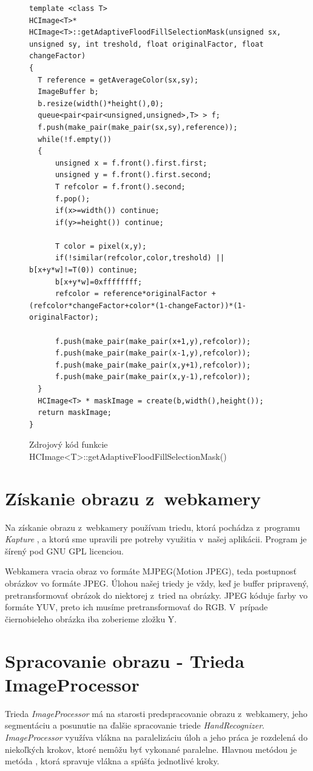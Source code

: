 \begin{figure}[htp]
\begin{lstlisting}
template <class T>
HCImage<T>* HCImage<T>::getAdaptiveFloodFillSelectionMask(unsigned sx, unsigned sy, int treshold, float originalFactor, float changeFactor)
{
  T reference = getAverageColor(sx,sy);
  ImageBuffer b;
  b.resize(width()*height(),0);
  queue<pair<pair<unsigned,unsigned>,T> > f;
  f.push(make_pair(make_pair(sx,sy),reference));
  while(!f.empty())
  {
      unsigned x = f.front().first.first;
      unsigned y = f.front().first.second;
      T refcolor = f.front().second;
      f.pop();
      if(x>=width()) continue;
      if(y>=height()) continue;

      T color = pixel(x,y);
      if(!similar(refcolor,color,treshold) || b[x+y*w]!=T(0)) continue;
      b[x+y*w]=0xffffffff;
      refcolor = reference*originalFactor + (refcolor*changeFactor+color*(1-changeFactor))*(1-originalFactor);

      f.push(make_pair(make_pair(x+1,y),refcolor));
      f.push(make_pair(make_pair(x-1,y),refcolor));
      f.push(make_pair(make_pair(x,y+1),refcolor));
      f.push(make_pair(make_pair(x,y-1),refcolor));
  }
  HCImage<T> * maskImage = create(b,width(),height());
  return maskImage;
}\end{lstlisting}
\caption{Zdrojový kód funkcie HCImage<T>::getAdaptiveFloodFillSelectionMask()}
\label{fig:getAdaptiveFloodFillSelectionMask}
\end{figure}

\section{Získanie obrazu z~webkamery}
Na získanie obrazu z~webkamery používam triedu, ktorá pochádza z~programu \textit{Kapture} \cite{kapture}, a ktorú sme upravili pre potreby využitia v~našej aplikácii. Program je šírený pod GNU GPL licenciou.

Webkamera vracia obraz vo formáte MJPEG(Motion JPEG), teda postupnosť obrázkov vo formáte JPEG. Úlohou našej triedy je vždy, keď je buffer pripravený,  pretransformovať obrázok do niektorej z~tried na obrázky. JPEG kóduje farby vo formáte YUV, preto ich musíme pretransformovať do RGB. V~prípade čiernobieleho obrázka iba zoberieme zložku Y.

\section{Spracovanie obrazu - Trieda ImageProcessor}
\label{chap:imageprocess}
Trieda \textit{ImageProcessor} má na starosti predspracovanie obrazu z~webkamery, jeho segmentáciu a posunutie na ďalšie spracovanie triede \textit{HandRecognizer}. \textit{ImageProcessor} využíva vlákna na paralelizáciu úloh a jeho práca je rozdelená do niekoľkých krokov, ktoré nemôžu byť vykonané paralelne. Hlavnou metódou je metóda , ktorá spravuje vlákna a spúšťa jednotlivé kroky. 

